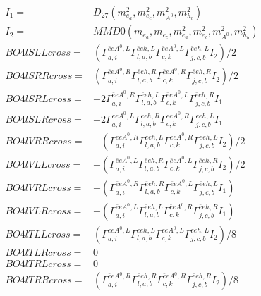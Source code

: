 \documentclass[A4,landscape]{article}
\begin{document}
\begin{align} 
I_1 = & D_{27}(m^2_{e_{{a}}}, m^2_{e_{{c}}}, m^2_{A^0}, m^2_{h_{{b}}}) \\ 
I_2 = & MMD0(m_{e_{{a}}}, m_{e_{{c}}}, m^2_{e_{{a}}}, m^2_{e_{{c}}}, m^2_{A^0}, m^2_{h_{{b}}}) \\ 
  BO4lSLLcross= & ( \Gamma^{\bar{e}e A^0 ,L}_{a, i} \Gamma^{\bar{e}e h ,L}_{l, a, b} \Gamma^{\bar{e}e A^0 ,L}_{c, k} \Gamma^{\bar{e}e h ,L}_{j, c, b} I_2)/2 \\ 
  BO4lSRRcross= & ( \Gamma^{\bar{e}e A^0 ,R}_{a, i} \Gamma^{\bar{e}e h ,R}_{l, a, b} \Gamma^{\bar{e}e A^0 ,R}_{c, k} \Gamma^{\bar{e}e h ,R}_{j, c, b} I_2)/2 \\ 
  BO4lSRLcross= & -2  \Gamma^{\bar{e}e A^0 ,R}_{a, i} \Gamma^{\bar{e}e h ,L}_{l, a, b} \Gamma^{\bar{e}e A^0 ,L}_{c, k} \Gamma^{\bar{e}e h ,R}_{j, c, b} I_1 \\ 
  BO4lSLRcross= & -2  \Gamma^{\bar{e}e A^0 ,L}_{a, i} \Gamma^{\bar{e}e h ,R}_{l, a, b} \Gamma^{\bar{e}e A^0 ,R}_{c, k} \Gamma^{\bar{e}e h ,L}_{j, c, b} I_1 \\ 
  BO4lVRRcross= & -( \Gamma^{\bar{e}e A^0 ,R}_{a, i} \Gamma^{\bar{e}e h ,L}_{l, a, b} \Gamma^{\bar{e}e A^0 ,R}_{c, k} \Gamma^{\bar{e}e h ,L}_{j, c, b} I_2)/2 \\ 
  BO4lVLLcross= & -( \Gamma^{\bar{e}e A^0 ,L}_{a, i} \Gamma^{\bar{e}e h ,R}_{l, a, b} \Gamma^{\bar{e}e A^0 ,L}_{c, k} \Gamma^{\bar{e}e h ,R}_{j, c, b} I_2)/2 \\ 
  BO4lVRLcross= & -( \Gamma^{\bar{e}e A^0 ,R}_{a, i} \Gamma^{\bar{e}e h ,R}_{l, a, b} \Gamma^{\bar{e}e A^0 ,L}_{c, k} \Gamma^{\bar{e}e h ,L}_{j, c, b} I_1) \\ 
  BO4lVLRcross= & -( \Gamma^{\bar{e}e A^0 ,L}_{a, i} \Gamma^{\bar{e}e h ,L}_{l, a, b} \Gamma^{\bar{e}e A^0 ,R}_{c, k} \Gamma^{\bar{e}e h ,R}_{j, c, b} I_1) \\ 
  BO4lTLLcross= & ( \Gamma^{\bar{e}e A^0 ,L}_{a, i} \Gamma^{\bar{e}e h ,L}_{l, a, b} \Gamma^{\bar{e}e A^0 ,L}_{c, k} \Gamma^{\bar{e}e h ,L}_{j, c, b} I_2)/8 \\ 
  BO4lTLRcross= & 0 \\ 
  BO4lTRLcross= & 0 \\ 
  BO4lTRRcross= & ( \Gamma^{\bar{e}e A^0 ,R}_{a, i} \Gamma^{\bar{e}e h ,R}_{l, a, b} \Gamma^{\bar{e}e A^0 ,R}_{c, k} \Gamma^{\bar{e}e h ,R}_{j, c, b} I_2)/8 \\ 
\end{align} 
\end{document}
